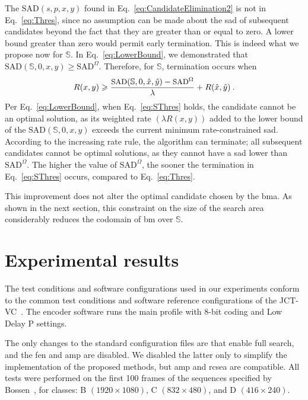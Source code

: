 \documentclass{article}
\newcommand{\eq}[1]{Eq.~\eqref{#1}}
\newcommand{\lowersad}{
    \text{SAD}^\Omega
}
\begin{document}
The $\text{SAD}(s,p,x,y)$ found in \eq{eq:CandidateElimination2} is not in \eq{eq:Thres}, since no assumption can be made about the \gls{sad} of subsequent candidates beyond the fact that they are greater than or equal to zero. A lower bound greater than zero would permit early termination. This is indeed what we propose now for $\mathbb{S}$. In \eq{eq:LowerBound}, we demonstrated that $\text{SAD}(\mathbb{S},0,x,y) \geqslant \lowersad$. Therefore, for $\mathbb{S}$, termination occurs when  
\begin{equation}
\small{
R(x,y) \geqslant \frac{\text{SAD}(\mathbb{S},0,\hat{x},\hat{y}) - \lowersad}{\lambda} + R(\hat{x},\hat{y}) \:.
}
\label{eq:SThres}
\end{equation}
Per \eq{eq:LowerBound}, when \eq{eq:SThres} holds, the candidate cannot be an optimal solution, as its weighted rate $(\lambda R(x,y))$ added to the lower bound of the $\text{SAD}(\mathbb{S},0,x,y)$ exceeds the current minimum rate-constrained \gls{sad}. According to the increasing rate rule, the algorithm can terminate; all subsequent candidates cannot be optimal solutions, as they cannot have a \gls{sad} lower than $\lowersad$. The higher the value of $\lowersad$, the sooner the termination in \eq{eq:SThres} occurs, compared to \eq{eq:Thres}. 

This improvement does not alter the optimal candidate chosen by the \gls{bma}. As shown in the next section, this constraint on the size of the search area considerably reduces the codomain of \gls{bm} over $\mathbb{S}$.


\section{Experimental results}
\label{sec:Results}
\vspace{-0.5em}

The test conditions and software configurations used in our experiments conform to the common test conditions and software reference configurations of the JCT-VC~\cite{Bossen2014}. The encoder software runs the main profile with $8$-bit coding and Low Delay P settings.

The only changes to the standard configuration files are that enable full search, and the \gls{fen} and \gls{amp} are disabled. We disabled the latter only to simplify the implementation of the proposed methods, but \gls{amp} and \gls{rcsea} are compatible. All tests were performed on the first 100 frames of the sequences specified by Bossen~\cite{Bossen2014}, for classes: B $(1920 \times 1080)$, C $(832 \times 480)$, and D $(416 \times 240)$.
\end{document}
